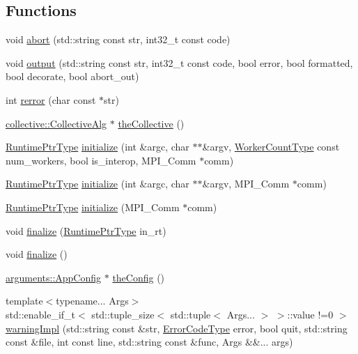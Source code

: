 \subsection*{Functions}
\begin{DoxyCompactItemize}
\item 
void \hyperlink{namespacevt_ad36ca8eb7e5b9cc794a793b290b9c2c7}{abort} (std\+::string const str, int32\+\_\+t const code)
\item 
void \hyperlink{namespacevt_ad3ca3e8710dd3c8badff897f8de3c858}{output} (std\+::string const str, int32\+\_\+t const code, bool error, bool formatted, bool decorate, bool abort\+\_\+out)
\item 
int \hyperlink{namespacevt_aff96ace008dc847d4c0f44cfa5dfb3a0}{rerror} (char const $\ast$str)
\item 
\hyperlink{structvt_1_1collective_1_1_collective_alg}{collective\+::\+Collective\+Alg} $\ast$ \hyperlink{namespacevt_aa8e0c0ab253e7ad1acd5d09e36fea769}{the\+Collective} ()
\item 
\hyperlink{namespacevt_a0ce60e0299d8fa32223b3b9ffa0af466}{Runtime\+Ptr\+Type} \hyperlink{namespacevt_aaa266774ea8339c58be0202b00fafa62}{initialize} (int \&argc, char $\ast$$\ast$\&argv, \hyperlink{namespacevt_aa93398ea48f2cb6c188512250f7cc248}{Worker\+Count\+Type} const num\+\_\+workers, bool is\+\_\+interop, M\+P\+I\+\_\+\+Comm $\ast$comm)
\item 
\hyperlink{namespacevt_a0ce60e0299d8fa32223b3b9ffa0af466}{Runtime\+Ptr\+Type} \hyperlink{namespacevt_adb614f53d39c8e84417ad7aac3265645}{initialize} (int \&argc, char $\ast$$\ast$\&argv, M\+P\+I\+\_\+\+Comm $\ast$comm)
\item 
\hyperlink{namespacevt_a0ce60e0299d8fa32223b3b9ffa0af466}{Runtime\+Ptr\+Type} \hyperlink{namespacevt_a9e13ed8a04b3395bbff2f035cae656af}{initialize} (M\+P\+I\+\_\+\+Comm $\ast$comm)
\item 
void \hyperlink{namespacevt_a540d90dbd6e97b69f1dcbc9ee9314cff}{finalize} (\hyperlink{namespacevt_a0ce60e0299d8fa32223b3b9ffa0af466}{Runtime\+Ptr\+Type} in\+\_\+rt)
\item 
void \hyperlink{namespacevt_ae8e663109f635cbeca94c39b89b4683c}{finalize} ()
\item 
\hyperlink{structvt_1_1arguments_1_1_app_config}{arguments\+::\+App\+Config} $\ast$ \hyperlink{namespacevt_aa17c6eae35e7e41a8b11d4047b7c0839}{the\+Config} ()
\item 
{\footnotesize template$<$typename... Args$>$ }\\std\+::enable\+\_\+if\+\_\+t$<$ std\+::tuple\+\_\+size$<$ std\+::tuple$<$ Args... $>$ $>$\+::value !=0 $>$ \hyperlink{namespacevt_aa6fe252e38e90473ff359bfa7586bc8b}{warning\+Impl} (std\+::string const \&str, \hyperlink{namespacevt_a793764d753923abc3d32929870beb485}{Error\+Code\+Type} error, bool quit, std\+::string const \&file, int const line, std\+::string const \&func, Args \&\&... args)

\end{DoxyCompactItemize}
